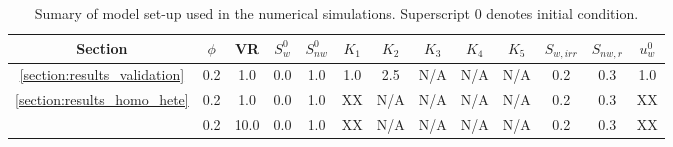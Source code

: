 
\begin{landscape}
\begin{table}
  \begin{tabular}{c | c c  c  c  c  c  c  c  c  c  c   c}
    \hline
      {\bf Section} & $\phi$ & VR  & $S^{0}_{w}$ & $S^{0}_{nw}$ & $K_{1}$ & $K_{2}$ & $K_{3}$ & $K_{4}$ & $K_{5}$ & $S_{w,irr}$ & $S_{nw,r}$ & $u^{0}_{w}$ \\ 
    \hline
      \ref{section:results_validation} & 0.2  & 1.0  & 0.0  & 1.0  & 1.0  & 2.5  & N/A  & N/A  & N/A & 0.2  & 0.3 & 1.0 \\
      \ref{section:results_homo_hete}   & 0.2  & 1.0  & 0.0  & 1.0  &  XX  & N/A  & N/A  & N/A  & N/A & 0.2  & 0.3 & XX  \\
                                       & 0.2  & 10.0 & 0.0  & 1.0  &  XX  & N/A  & N/A  & N/A  & N/A & 0.2  & 0.3 & XX  \\
      \hline
   \end{tabular}
   \caption{Sumary of model set-up used in the numerical simulations. Superscript $0$ denotes initial condition. }\label{table:setup}
\end{table}
\end{landscape}
\clearpage
